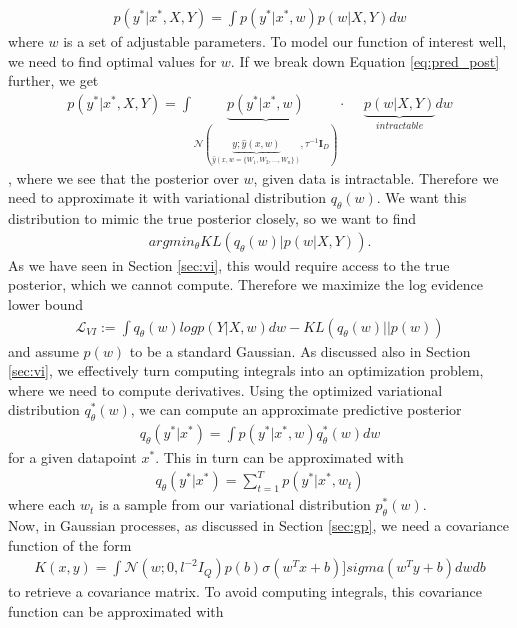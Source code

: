 \documentclass[a4paper,cleardoubleempty,BCOR1cm, 11pt]{report}
\begin{document}
\begin{align}\label{eq:pred_post}
 p(y^*|x^*, X,Y) = \int p(y^*|x^*, w)p(w|X,Y)dw
\end{align}
where $w$ is a set of adjustable parameters. To model our function of interest well, we need to find optimal values for $w$. If we break down Equation \ref{eq:pred_post} further, we get
\begin{align}
p(y^*|x^*, X,Y) = \int \underbrace{p(y^*|x^*,w)}_{\mathcal{N}(\underbrace{y;\hat{y}(x,w)}_{\hat{y}(x, w=\lbrace W_1, W_2,...,W_n\rbrace)},\tau^{-1}\mathbf{I}_D)} \cdot \hspace{15pt}\underbrace{p(w|X,Y)}_{intractable}dw
\end{align}
, where we see that the posterior over $w$, given data is intractable. Therefore we need to approximate it with variational distribution $q_{\theta}(w)$. We want this distribution to mimic the true posterior closely, so we want to find
\begin{align*}
	argmin_{\theta} KL(q_{\theta}(w)|p(w|X,Y)).
\end{align*}
As we have seen in Section \ref{sec:vi}, this would require access to the true posterior, which we cannot compute. Therefore we maximize the log evidence lower bound
\begin{align*}
\mathcal{L}_{VI} := \int q_{\theta}(w) log p (Y|X, w)dw - KL(q_{\theta}(w)||p(w))
\end{align*}
and assume $p(w)$ to be a standard Gaussian. As discussed also in Section \ref{sec:vi}, we effectively turn computing integrals into an optimization problem, where we need to compute derivatives. Using the optimized variational distribution $q_{\theta}^*(w)$, we can compute an approximate predictive posterior 
\begin{align*}
q_{\theta}(y^*|x^*) = \int p(y^*|x^*, w)q_{\theta}^*(w)dw
\end{align*}
for a given datapoint $x^*$. This in turn can be approximated with
\begin{align*}
q_{\theta}(y^*|x^*) = \sum_{t=1}^{T}p(y^*|x^*, w_t)
\end{align*}
where each $w_t$ is a sample from our variational distribution $p_{\theta}^*(w)$.
\\
Now, in Gaussian processes, as discussed in Section \ref{sec:gp}, we need a covariance function of the form 
\begin{align*}
K(x,y) = \int \mathcal{N}(w;0, l^{-2} I_Q)p(b)\sigma(w^Tx+b)]sigma(w^Ty +b)dwdb
\end{align*}
to retrieve a covariance matrix. To avoid computing integrals, this covariance function can be approximated with
\end{document}
